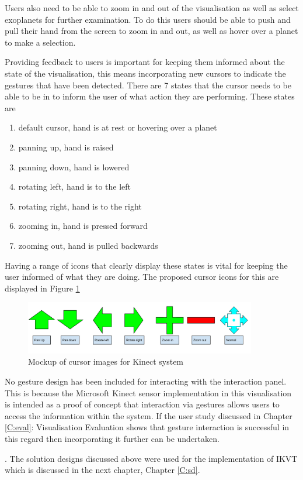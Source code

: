 \begin{enumerate}
Users also need to be able to
zoom in and out of the visualisation as well as select exoplanets for further
examination. To do this users should be able to
push and pull their hand from the screen to zoom in and out, as well as
hover over a planet to make a selection.

Providing feedback to users is important for keeping them informed about the state of the visualisation, this means
incorporating new cursors to indicate the gestures that have been detected.
There are 7 states that the cursor needs to be able to be in to inform the user
of what action they are performing. These states are

\begin{enumerate}
 \item default cursor, hand is at rest or hovering over a planet
 \item panning up, hand is raised
 \item panning down, hand is lowered
 \item rotating left, hand is to the left
 \item rotating right, hand is to the right
 \item zooming in, hand is pressed forward
 \item zooming out, hand is pulled backwards
\end{enumerate}
Having a range of icons that clearly display these states is vital for keeping
the user informed of what they are doing. The proposed cursor icons for this are
displayed in Figure \ref{fig:cursors}
\begin{figure}[H]
  \centering
      \includegraphics[width=0.9\textwidth]{images/curserImages.png}
  \caption{Mockup of cursor images for Kinect system}  
  \label{fig:cursors}
\end{figure}

No gesture design has been included for interacting with the interaction panel.
This is because the Microsoft Kinect sensor implementation in this visualisation
is intended as a proof of concept that interaction via gestures allows users
to access the information within the system. If the user study discussed in
Chapter \ref{C:eval}: Visualisation Evaluation shows that gesture interaction is
successful in this regard then incorporating it further can be undertaken.
\end{enumerate}. The solution designs discussed above were used for the implementation of IKVT which is discussed in the next chapter, Chapter \ref{C:sd}.
